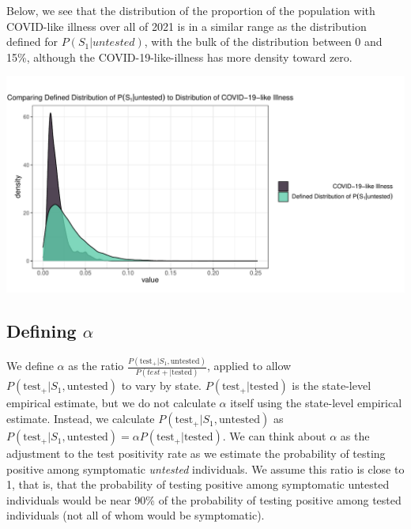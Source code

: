 \documentclass[12pt,twoside]{smiththesis}
\begin{document}
Below, we see that the distribution of the proportion of the population with COVID-like illness over all of 2021 is in a similar range as the distribution defined for \(P(S_1|untested)\), with the bulk of the distribution between 0 and 15\%, although the COVID-19-like-illness has more density toward zero.
\begin{center}\includegraphics[width=0.8\linewidth]{figure/emp_p_s_untested} \end{center}

\hypertarget{defining-alpha}{%
\subsection{\texorpdfstring{Defining \(\alpha\)}{Defining \textbackslash alpha}}\label{defining-alpha}}

We define \(\alpha\) as the ratio \(\frac{P(\text{test}_+|S_1, \text{untested})}{P(test+|\text{tested})}\), applied to allow
\(P(\text{test}_+|S_1, \text{untested})\) to vary by state. \(P(\text{test}_+|\text{tested})\) is the state-level empirical estimate, but we do not calculate \(\alpha\) itself using the state-level empirical estimate. Instead, we calculate \(P(\text{test}_+|S_1, \text{untested})\) as \(P(\text{test}_+|S_1, \text{untested}) =\alpha P(\text{test}_+|\text{tested})\). We can think about \(\alpha\) as the adjustment to the test positivity rate as we estimate the probability of testing positive among symptomatic \emph{untested} individuals. We assume this ratio is close to 1, that is, that the probability of testing positive among symptomatic untested individuals would be near 90\% of the probability of testing positive among tested individuals (not all of whom would be symptomatic).
\end{document}
